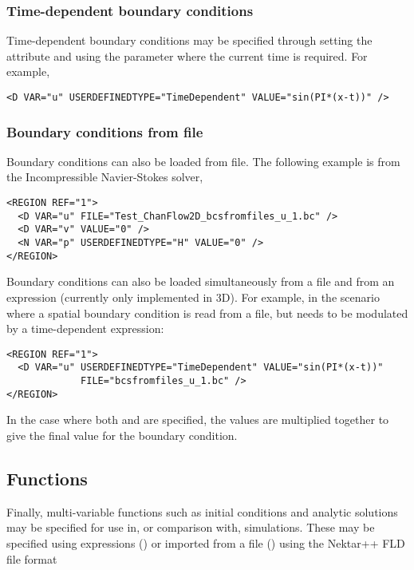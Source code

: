 \subsubsection{Time-dependent boundary conditions}
Time-dependent boundary conditions may be specified through setting the
 attribute and using the parameter  where the
current time is required. For example,
\begin{lstlisting}[style=XMLStyle]
<D VAR="u" USERDEFINEDTYPE="TimeDependent" VALUE="sin(PI*(x-t))" />
\end{lstlisting}

\subsubsection{Boundary conditions from file}
Boundary conditions can also be loaded from file. The following example is from
the Incompressible Navier-Stokes solver,
\begin{lstlisting}[style=XMLStyle]
<REGION REF="1">
  <D VAR="u" FILE="Test_ChanFlow2D_bcsfromfiles_u_1.bc" />
  <D VAR="v" VALUE="0" />
  <N VAR="p" USERDEFINEDTYPE="H" VALUE="0" />
</REGION>
\end{lstlisting}

Boundary conditions can also be loaded simultaneously from a file and from an 
expression (currently only implemented in 3D).
For example, in the scenario where a spatial boundary 
condition is read from a file, but needs to be modulated by a time-dependent 
expression:
\begin{lstlisting}[style=XMLStyle]
<REGION REF="1">
  <D VAR="u" USERDEFINEDTYPE="TimeDependent" VALUE="sin(PI*(x-t))"
             FILE="bcsfromfiles_u_1.bc" />
</REGION>
\end{lstlisting}

In the case where both  and  are specified, the values
are multiplied together to give the final value for the boundary condition. 

\subsection{Functions}

Finally, multi-variable functions such as initial conditions and analytic
solutions may be specified for use in, or comparison with, simulations. These
may be specified using expressions () or imported from a file
() using the Nektar++ FLD file format

